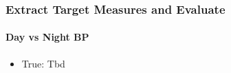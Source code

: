 \documentclass[
	8pt, %
]{beamer}
\begin{document}
\begin{frame}
	\frametitle{Extract Target Measures and Evaluate}
	\framesubtitle{Day vs Night BP} %
	\begin{itemize}
			\item True: Tbd
	\end{itemize}

\end{frame}






%
%
%
%
%
%
%
%
%
%
%
\end{document}
